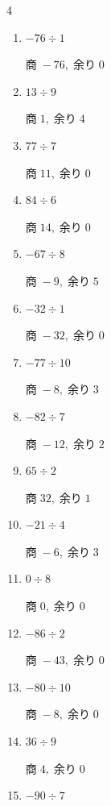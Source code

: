 \begin{multicols}{4}
\begin{enumerate}
        $商\; -51,\; 余り\; 0$

  \item $-76 \div 1$

        $商\; -76,\; 余り\; 0$

  \item $13 \div 9$

        $商\; 1,\; 余り\; 4$

  \item $77 \div 7$

        $商\; 11,\; 余り\; 0$

  \item $84 \div 6$

        $商\; 14,\; 余り\; 0$

  \item $-67 \div 8$

        $商\; -9,\; 余り\; 5$

  \item $-32 \div 1$

        $商\; -32,\; 余り\; 0$

  \item $-77 \div 10$

        $商\; -8,\; 余り\; 3$

  \item $-82 \div 7$

        $商\; -12,\; 余り\; 2$

  \item $65 \div 2$

        $商\; 32,\; 余り\; 1$

  \item $-21 \div 4$

        $商\; -6,\; 余り\; 3$

  \item $0 \div 8$

        $商\; 0,\; 余り\; 0$

  \item $-86 \div 2$

        $商\; -43,\; 余り\; 0$

  \item $-80 \div 10$

        $商\; -8,\; 余り\; 0$

\columnbreak %

  \item $36 \div 9$

        $商\; 4,\; 余り\; 0$

  \item $-90 \div 7$


\end{enumerate}
\end{multicols}
